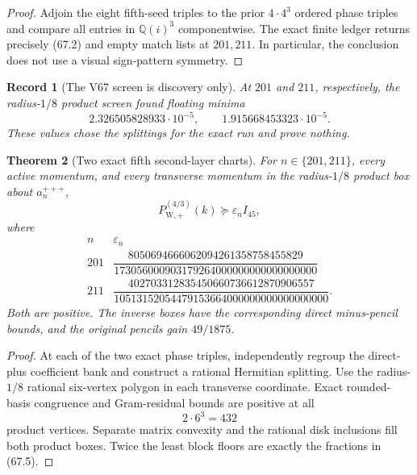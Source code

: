 \documentclass[11pt,oneside]{article}
\newtheorem{theorem}{Theorem}[section]
\newtheorem{record}[theorem]{Record}
\theoremstyle{definition}
\theoremstyle{remark}
\begin{document}
\begin{proof}
Adjoin the eight fifth-seed triples to the prior \(4\cdot4^3\)
ordered phase triples and compare all entries in
\(\mathbb Q(i)^3\) componentwise.  The exact finite ledger returns
precisely (67.2) and empty match lists at \(201,211\).  In
particular, the conclusion does not use a visual sign-pattern
symmetry.
\end{proof}

\begin{record}[The V67 screen is discovery only]
\label{rec:newv67-screen}
At \(201\) and \(211\), respectively, the radius-\(1/8\) product
screen found floating minima
\[
 2.326505828933\cdot10^{-5},\qquad
 1.915668453323\cdot10^{-5}.                          \tag{67.3}
\]
These values chose the splittings for the exact run and prove
nothing.
\end{record}

\begin{theorem}[Two exact fifth second-layer charts]
\label{thm:newv67-two-charts}
For \(n\in\{201,211\}\), every active momentum, and every transverse
momentum in the radius-\(1/8\) product box about
\(a_n^{+++}\),
\[
 P_{\mathrm W,+}^{(4/3)}(k)\succeq\varepsilon_n I_{45}, \tag{67.4}
\]
where
\[
\begin{array}{c|c}
n&\varepsilon_n\\ \hline
201&
\dfrac{8050694666062094261358758455829}
 {173056000903179264000000000000000000}\\[6pt]
211&
\dfrac{402703312835450660736612870906557}
 {10513152054479153664000000000000000000}.
\end{array}                                           \tag{67.5}
\]
Both are positive.  The inverse boxes have the corresponding direct
minus-pencil bounds, and the original pencils gain \(49/1875\).
\end{theorem}

\begin{proof}
At each of the two exact phase triples, independently regroup the
direct-plus coefficient bank and construct a rational Hermitian
splitting.  Use the radius-\(1/8\) rational six-vertex polygon in
each transverse coordinate.  Exact rounded-basis congruence and
Gram-residual bounds are positive at all
\[
 2\cdot6^3=432                                        \tag{67.6}
\]
product vertices.  Separate matrix convexity and the rational disk
inclusions fill both product boxes.  Twice the least block floors
are exactly the fractions in (67.5).
\end{proof}
\end{document}

